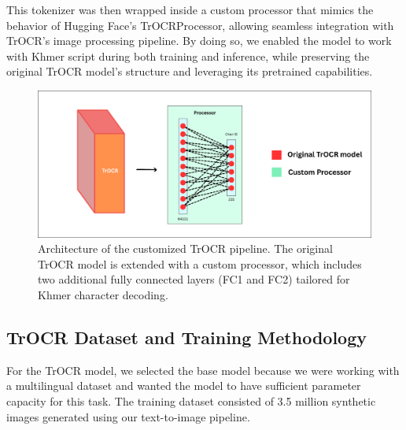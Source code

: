 This tokenizer was then wrapped inside a custom processor that mimics the behavior of Hugging Face's TrOCRProcessor, allowing seamless integration with TrOCR's image processing pipeline. By doing so, we enabled the model to work with Khmer script during both training and inference, while preserving the original TrOCR model's structure and leveraging its pretrained capabilities.

\begin{figure}[H]
    \centering
    \includegraphics[width=\textwidth]{figures/Customize_processor.png}
    \caption{Architecture of the customized TrOCR pipeline. 
    The original TrOCR model is extended with a custom processor, 
    which includes two additional fully connected layers 
    (FC1 and FC2) tailored for Khmer character decoding.}
    \label{fig:trocr-custom-processor}
\end{figure}

\subsection{TrOCR Dataset and Training Methodology}
\label{subsec:trocr-training}

For the TrOCR model, we selected the base model because we were working with a multilingual dataset and wanted the model to have sufficient parameter capacity for this task. The training dataset consisted of 3.5 million synthetic images generated using our text-to-image pipeline.

